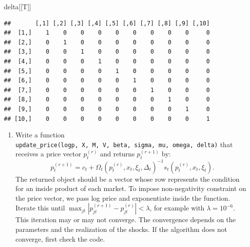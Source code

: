 \documentclass[
]{book}
\newenvironment{Shaded}{\begin{snugshade}}{\end{snugshade}}
\newcommand{\NormalTok}[1]{#1}
\providecommand{\tightlist}{%
  \setlength{\itemsep}{0pt}\setlength{\parskip}{0pt}}
\begin{document}
\begin{Shaded}
\begin{Highlighting}[]
\NormalTok{delta[[T]]}
\end{Highlighting}
\end{Shaded}

\begin{verbatim}
##       [,1] [,2] [,3] [,4] [,5] [,6] [,7] [,8] [,9] [,10]
##  [1,]    1    0    0    0    0    0    0    0    0     0
##  [2,]    0    1    0    0    0    0    0    0    0     0
##  [3,]    0    0    1    0    0    0    0    0    0     0
##  [4,]    0    0    0    1    0    0    0    0    0     0
##  [5,]    0    0    0    0    1    0    0    0    0     0
##  [6,]    0    0    0    0    0    1    0    0    0     0
##  [7,]    0    0    0    0    0    0    1    0    0     0
##  [8,]    0    0    0    0    0    0    0    1    0     0
##  [9,]    0    0    0    0    0    0    0    0    1     0
## [10,]    0    0    0    0    0    0    0    0    0     1
\end{verbatim}

\begin{enumerate}
\def\labelenumi{\arabic{enumi}.}
\setcounter{enumi}{6}
\tightlist
\item
  Write a function \texttt{update\_price(logp,\ X,\ M,\ V,\ beta,\ sigma,\ mu,\ omega,\ delta)} that receives a price vector \(p_t^{(r)}\) and returns \(p_t^{(r + 1)}\) by:
  \[
  p_t^{(r + 1)} = c_t + \Omega_t(p_t^{(r)}, x_t, \xi_t, \Delta_t)^{-1} s_t(p_t^{(r)}, x_t, \xi_t).
  \]
  The returned object should be a vector whose row represents the condition for an inside product of each market. To impose non-negativity constraint on the price vector, we pass log price and exponentiate inside the function. Iterate this until \(\max_{jt}|p_{jt}^{(r + 1)} - p_{jt}^{(r)}| < \lambda\), for example with \(\lambda = 10^{-6}\). This iteration may or may not converge. The convergence depends on the parameters and the realization of the shocks. If the algorithm does not converge, first check the code.
\end{enumerate}
\end{document}
